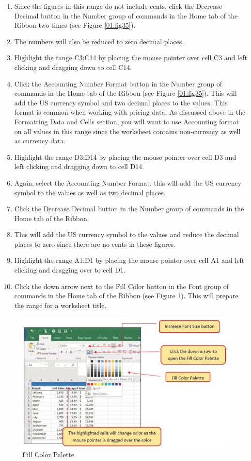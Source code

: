 \begin{enumerate}[resume]
	\item Since the figures in this range do not include cents, click the Decrease Decimal button in the Number group of commands in the Home tab of the Ribbon two times (see Figure \ref{01:fig35}).
	\item The numbers will also be reduced to zero decimal places.
	\item Highlight the range \textsf{C3:C14} by placing the mouse pointer over cell \textsf{C3} and left clicking and dragging down to cell \textsf{C14}.
	\item Click the Accounting Number Format button in the Number group of commands in the Home tab of the Ribbon (see Figure \ref{01:fig35}). This will add the US currency symbol and two decimal places to the values. This format is common when working with pricing data. As discussed above in the Formatting Data and Cells section, you will want to use Accounting format on all values in this range since the worksheet contains non-currency as well as currency data.
	\item Highlight the range \textsf{D3:D14} by placing the mouse pointer over cell \textsf{D3} and left clicking and dragging down to cell \textsf{D14}.
	\item Again, select the Accounting Number Format; this will add the US currency symbol to the values as well as two decimal places.
	\item Click the Decrease Decimal button in the Number group of commands in the Home tab of the Ribbon.
	\item This will add the US currency symbol to the values and reduce the decimal places to zero since there are no cents in these figures.
	\item Highlight the range \textsf{A1:D1} by placing the mouse pointer over cell \textsf{A1} and left clicking and dragging over to cell \textsf{D1}.
	\item Click the down arrow next to the Fill Color button in the Font group of commands in the Home tab of the Ribbon (see Figure \ref{01:fig36}). This will prepare the range for a worksheet title.
\end{enumerate}

\begin{figure}[H]
	\centering
	\includegraphics[width=\maxwidth{.95\linewidth}]{gfx/ch01_fig36}
	\caption{Fill Color Palette}
	\label{01:fig36}
\end{figure}

